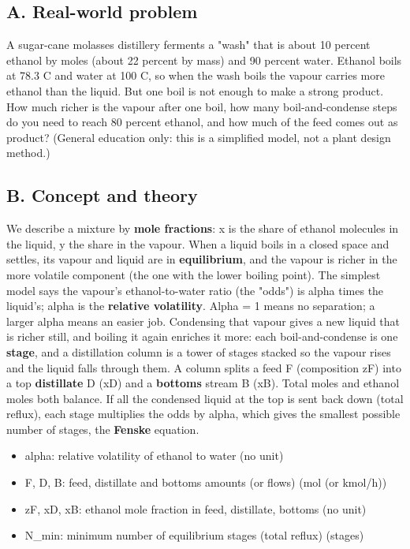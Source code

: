 \documentclass[11pt,a4paper]{article}
\begin{document}
\subsection*{A. Real-world problem}
A sugar-cane molasses distillery ferments a "wash" that is about 10 percent ethanol by moles (about 22 percent by mass) and 90 percent water. Ethanol boils at 78.3 C and water at 100 C, so when the wash boils the vapour carries more ethanol than the liquid. But one boil is not enough to make a strong product. How much richer is the vapour after one boil, how many boil-and-condense steps do you need to reach 80 percent ethanol, and how much of the feed comes out as product? (General education only: this is a simplified model, not a plant design method.)

\subsection*{B. Concept and theory}
We describe a mixture by \textbf{mole fractions}: x is the share of ethanol molecules in the liquid, y the share in the vapour. When a liquid boils in a closed space and settles, its vapour and liquid are in \textbf{equilibrium}, and the vapour is richer in the more volatile component (the one with the lower boiling point). The simplest model says the vapour's ethanol-to-water ratio (the "odds") is alpha times the liquid's; alpha is the \textbf{relative volatility}. Alpha = 1 means no separation; a larger alpha means an easier job. Condensing that vapour gives a new liquid that is richer still, and boiling it again enriches it more: each boil-and-condense is one \textbf{stage}, and a distillation column is a tower of stages stacked so the vapour rises and the liquid falls through them. A column splits a feed F (composition zF) into a top \textbf{distillate} D (xD) and a \textbf{bottoms} stream B (xB). Total moles and ethanol moles both balance. If all the condensed liquid at the top is sent back down (total reflux), each stage multiplies the odds by alpha, which gives the smallest possible number of stages, the \textbf{Fenske} equation.

\begin{itemize}[nosep]
\item alpha: relative volatility of ethanol to water (no unit)
\item F, D, B: feed, distillate and bottoms amounts (or flows) (mol (or kmol/h))
\item zF, xD, xB: ethanol mole fraction in feed, distillate, bottoms (no unit)
\item N\_min: minimum number of equilibrium stages (total reflux) (stages)
\end{itemize}
\end{document}
